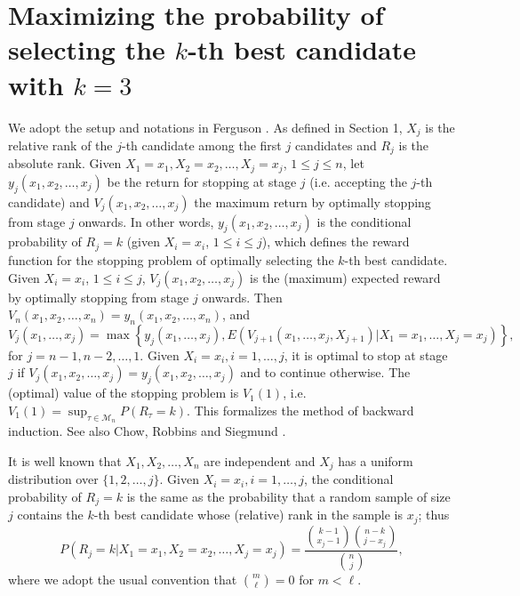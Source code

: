 \documentclass[12pt, A4paper, oneside]{article}
\theoremstyle{plain}
\numberwithin{equation}{section}
\begin{document}
\section{Maximizing the probability of selecting the $k$-th best candidate with $k=3$}
\hspace*{18pt} We adopt the setup and notations in Ferguson \cite[Chapter 2]{ref5}. As defined in Section 1, $X_j$ is
the relative rank of the $j$-th candidate among the first $j$ candidates and $R_j$ is the absolute rank. Given $X_1=x_1,X_2=x_2,\dots,X_j=x_j$, $1\le j\le n$, let $y_j(x_1,x_2,\dots,x_j)$ be the return for stopping at stage $j$ (i.e. accepting the $j$-th candidate) and $V_j(x_1,x_2,\dots,x_j)$ the maximum return by optimally stopping from stage $j$ onwards. In other words, $y_j(x_1,x_2,\dots,x_j)$ is the conditional probability of $R_j=k$ (given $X_i=x_i$, $1\le i\le j$), which defines the reward function for the stopping problem of optimally selecting the $k$-th best candidate. Given $X_i=x_i$, $1\le i\le j$, $V_j(x_1,x_2,\dots,x_j)$ is the (maximum) expected reward by optimally stopping from stage $j$ onwards. Then
$V_n(x_1,x_2,\dots,x_n)=y_n(x_1,x_2,\dots,x_n)$, and
\begin{equation}\label{se2.1}
V_j\left(x_1,\dots,x_j\right)=\max\left\{y_j(x_1,\dots,x_j),E\left(V_{j+1}\left(x_1,\dots,x_j,X_{j+1}\right)\Big|X_1=x_1,\dots,X_j=x_j\right)\right\},
\end{equation}
for $j=n-1,n-2,\dots,1$. Given $X_i=x_i, i=1,\dots,j$, it is optimal to stop at stage $j$ if $V_j\left(x_1,x_2,\dots,x_j\right)=y_j(x_1,x_2,\dots,x_j)$ and to continue otherwise. The (optimal) value of the stopping problem is $V_1(1)$, i.e. $V_1(1)=\sup_{\tau\in\mathcal{M}_n}P(R_{\tau}=k)$. This formalizes the method of backward induction. See also Chow, Robbins and Siegmund \cite{ref3}.

It is well known that $X_1,X_2,\dots, X_n$ are independent and $X_j$ has a uniform distribution over $\{1,2,\dots,j\}$.
Given $X_i=x_i, i=1,\dots,j$, the conditional probability  of $R_j=k$ is the same as the probability that a random sample of size $j$ contains the $k$-th best candidate whose (relative) rank in the sample is $x_j$; thus
\begin{equation}\label{v11}
P(R_j=k|X_1=x_1,X_2=x_2,\dots,X_j=x_j)=\frac{{k-1\choose x_j-1}{n-k\choose j-x_j}}{{n\choose j}},
\end{equation}
where we adopt the usual convention that ${m\choose \ell}=0$ for $m<\ell$.
\end{document}
